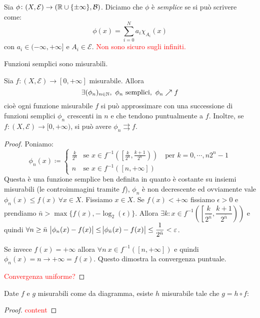 \begin{definition}
	Sia $ \phi\colon (X,\mathcal{E}) \to (\mathbb{R} \cup \{\pm\infty\}, \mathcal{B}) $. Diciamo che $ \phi $ è \emph{semplice} se si può scrivere come:
	\[ \phi(x) = \sum_{i=0}^N a_i \chi_{A_i}(x) \]
	con $ a_i \in (-\infty, +\infty] $ e $ A_i \in \mathcal{E} $. \textcolor{red}{Non sono sicuro sugli infiniti.}
\end{definition}
\begin{oss}
	Funzioni semplici sono misurabili.
\end{oss}
\begin{proposition}
	Sia $ f\colon (X,\mathcal{E}) \to [0, +\infty] $ misurabile. Allora
	\[ \exists (\phi_n)_{n\in\mathbb{N}},\ \phi_n \text{ semplici},\ \phi_n \nearrow f \]
	cioè ogni funzione misurabile $ f $ si può approssimare con una successione di funzioni semplici $ \phi_n $ crescenti in $ n $ e che tendono puntualmente a $ f $.
	Inoltre, se $ f\colon (X,\mathcal{E}) \to [0,+\infty) $, si può avere $ \phi_n \rightrightarrows f $.
\end{proposition}
\begin{proof}
	Poniamo:
	\[ \phi_n (x) \coloneqq
    \begin{cases}
			\frac{k}{2^n} & \text{se } x \in f^{-1}\left( \left[\frac{k}{2^n}, \frac{k+1}{2^n} \right)  \right) \quad\text{per } k=0,\cdots,n2^n-1\\
			n             & \text{se } x \in f^{-1}\left( [n, +\infty] \right)
		\end{cases}
	 \]
	Questa è una funzione semplice ben definita in quanto è costante su insiemi misurabili (le controimmagini tramite $ f $), $ \phi_n $ è non decrescente ed ovviamente vale $ \phi_n(x) \leq f(x)\ \forall x\in X $.
	Fissiamo $ x\in X $. Se $ f(x)<+\infty $ fissiamo $ \epsilon > 0 $ e prendiamo $ \bar n > \max\{ f(x), -\log_2(\epsilon) \} $. Allora $ \exists k : x\in f^{-1}\left( \left[\dfrac{k}{2^{\bar n} }, \dfrac{k+1}{2^{\bar n} } \right) \right) $ e quindi $ \forall n\ge \bar{n}\ \abs{\phi_n(x) - f(x)} \leq \abs{\phi_{\bar{n}}(x) - f(x)} \leq \dfrac{1}{2^{\bar n}} < \varepsilon $.

	Se invece $ f(x) = +\infty $ allora $ \forall n\ x\in f^{-1}\left( [n, +\infty] \right) $ e quindi $ \phi_n(x) = n \to +\infty = f(x) $. Questo dimostra la convergenza puntuale.

	\textcolor{red}{Convergenza uniforme?}
\end{proof}
\begin{proposition}
	Date $ f $ e $ g $ misurabili come da diagramma, esiste $ h $ misurabile tale che $ g=h\circ f $:
	\begin{center}
	\end{center}
\end{proposition}
\begin{proof}
	\textcolor{red}{content}
\end{proof}

